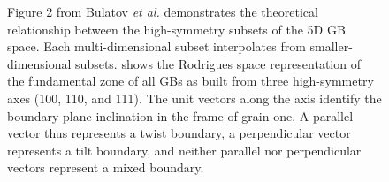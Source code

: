 \documentclass[12pt]{report}
\begin{document}
\begin{figure}[ht!]
 \centering
 \quad
 \caption[The theoretical relationship between high-symmetry subsets and fundamental zone.]{\label{fig:bulatovFig2}Figure 2 from Bulatov \emph{et al.}\cite{bulatov2014} \protect{} demonstrates the theoretical relationship between the high-symmetry subsets of the 5D GB space.  Each multi-dimensional subset interpolates from smaller-dimensional subsets. \protect{} shows the Rodrigues space representation of the fundamental zone of all GBs as built from three high-symmetry axes (\textlangle{}100\textrangle{}, \textlangle{}110\textrangle{}, and \textlangle{}111\textrangle{}).  The unit vectors along the axis identify the boundary plane inclination in the frame of grain one.  A parallel vector thus represents a twist boundary, a perpendicular vector represents a tilt boundary, and neither parallel nor perpendicular vectors represent a mixed boundary.}
\end{figure}
\end{document}

